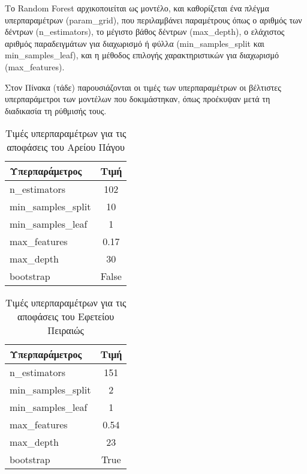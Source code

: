 \documentclass[diploma]{softlab-thesis}
\begin{document}
\begin{enumerate}
\begin{enumerate}
Το Random Forest αρχικοποιείται ως μοντέλο, και καθορίζεται ένα πλέγμα υπερπαραμέτρων (param\_grid), που περιλαμβάνει παραμέτρους όπως ο αριθμός των δέντρων (n\_estimators), το μέγιστο βάθος δέντρων (max\_depth), ο ελάχιστος αριθμός παραδειγμάτων για διαχωρισμό ή φύλλα (min\_samples\_split και min\_samples\_leaf), και η μέθοδος επιλογής χαρακτηριστικών για διαχωρισμό (max\_features).

Στον Πίνακα (τάδε) παρουσιάζονται οι τιμές των υπερπαραμέτρων  οι βέλτιστες υπερπαράμετροι των μοντέλων που δοκιμάστηκαν, όπως προέκυψαν μετά τη διαδικασία τη ρύθμισής τους.

\begin{table}[h!]
\centering
\begin{tabular}{|l|c|}
\hline
\rowcolor[HTML]{FFFFFF} 
\textbf{Υπερπαράμετρος}      & \textbf{Τιμή}    \\ \hline
n\_estimators           & 102 \\ \hline
min\_samples\_split         &10      \\ \hline
min\_samples\_leaf & 1     \\ \hline
max\_features & 0.17   \\ \hline
max\_depth & 30   \\ \hline
bootstrap & False   \\ \hline
\end{tabular}
\caption{Τιμές υπερπαραμέτρων για τις αποφάσεις του Αρείου Πάγου}
\end{table}


\begin{table}[H]
\centering
\begin{tabular}{|l|c|}
\hline
\rowcolor[HTML]{FFFFFF} 
\textbf{Υπερπαράμετρος}      & \textbf{Τιμή}   \\ \hline
n\_estimators           & 151 \\ \hline
min\_samples\_split         &2      \\ \hline
min\_samples\_leaf & 1     \\ \hline
max\_features & 0.54   \\ \hline
max\_depth & 23   \\ \hline
bootstrap & True
   \\ \hline
\end{tabular}
\caption{Τιμές υπερπαραμέτρων για τις αποφάσεις του Εφετείου Πειραιώς}
\end{table}




\end{enumerate}
\end{enumerate}
\end{document}
